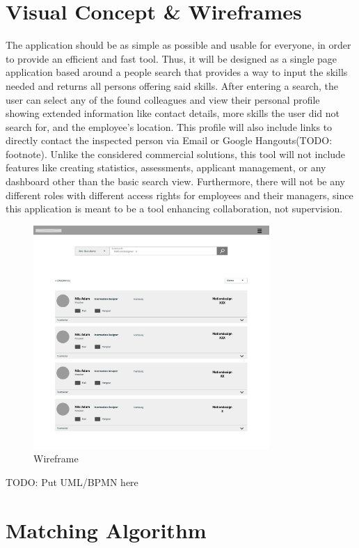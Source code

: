 \section{Visual Concept \& Wireframes}
The application should be as simple as possible and usable for everyone, in order to provide an efficient and fast tool. Thus, it will be designed as a single page application based around a people search that provides a way to input the skills needed and returns all persons offering said skills. After entering a search, the user can select any of the found colleagues and view their personal profile showing extended information like contact details, more skills the user did not search for, and the employee's location. This profile will also include links to directly contact the inspected person via Email or Google Hangouts(TODO: footnote). Unlike the considered commercial solutions, this tool will not include features like creating statistics, assessments, applicant management, or any dashboard other than the basic search view.
Furthermore, there will not be any different roles with different access rights for employees and their managers, since this application is meant to be a tool enhancing collaboration, not supervision.
\begin{figure}[h]
    \centering
    \includegraphics[width=0.8\textwidth]{images/wireframe.png}
    \caption{Wireframe}
    \label{fig:wireframe}
\end{figure}

TODO: Put UML/BPMN here

\section{Matching Algorithm}
